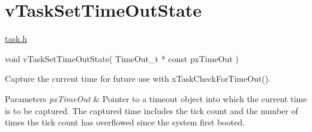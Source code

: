\hypertarget{group__v_task_set_time_out_state}{}\section{v\+Task\+Set\+Time\+Out\+State}
\label{group__v_task_set_time_out_state}
\mbox{\hyperlink{task_8h_source}{task.\+h}} 
\begin{DoxyPre}void vTaskSetTimeOutState( TimeOut\_t * const pxTimeOut )\end{DoxyPre}


Capture the current time for future use with x\+Task\+Check\+For\+Time\+Out().


\begin{DoxyParams}{Parameters}
{\em px\+Time\+Out} & Pointer to a timeout object into which the current time is to be captured. The captured time includes the tick count and the number of times the tick count has overflowed since the system first booted. \\
\hline
\end{DoxyParams}
